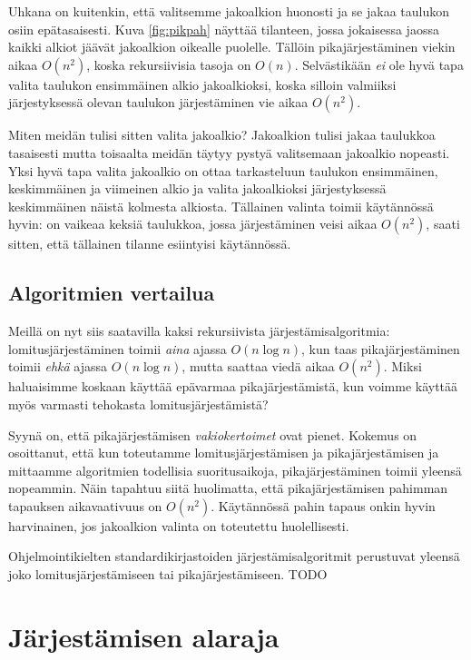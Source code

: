 Uhkana on kuitenkin, että valitsemme jakoalkion huonosti ja se jakaa
taulukon osiin epätasaisesti.
Kuva \ref{fig:pikpah} näyttää tilanteen, jossa jokaisessa jaossa
kaikki alkiot jäävät jakoalkion oikealle puolelle.
Tällöin pikajärjestäminen viekin aikaa $O(n^2)$, koska rekursiivisia
tasoja on $O(n)$.
Selvästikään \emph{ei} ole hyvä tapa valita taulukon ensimmäinen
alkio jakoalkioksi, koska silloin valmiiksi järjestyksessä olevan
taulukon järjestäminen vie aikaa $O(n^2)$.

Miten meidän tulisi sitten valita jakoalkio?
Jakoalkion tulisi jakaa taulukkoa tasaisesti mutta toisaalta
meidän täytyy pystyä valitsemaan jakoalkio nopeasti.
Yksi hyvä tapa valita jakoalkio on ottaa tarkasteluun
taulukon ensimmäinen, keskimmäinen ja viimeinen alkio ja valita
jakoalkioksi järjestyksessä keskimmäinen näistä kolmesta alkiosta.
Tällainen valinta toimii käytännössä hyvin:
on vaikeaa keksiä taulukkoa, jossa järjestäminen veisi aikaa $O(n^2)$,
saati sitten, että tällainen tilanne esiintyisi käytännössä.

\subsection{Algoritmien vertailua}

Meillä on nyt siis saatavilla kaksi rekursiivista järjestämisalgoritmia:
lomitusjärjestäminen toimii \emph{aina} ajassa $O(n \log n)$,
kun taas pikajärjestäminen toimii \emph{ehkä} ajassa $O(n \log n)$,
mutta saattaa viedä aikaa $O(n^2)$.
Miksi haluaisimme koskaan käyttää epävarmaa pikajärjestämistä,
kun voimme käyttää myös varmasti tehokasta lomitusjärjestämistä?

Syynä on, että pikajärjestämisen \emph{vakiokertoimet} ovat pienet.
Kokemus on osoittanut, että kun toteutamme lomitusjärjestämisen ja
pikajärjestämisen ja mittaamme algoritmien todellisia suoritusaikoja,
pikajärjestäminen toimii yleensä nopeammin.
Näin tapahtuu siitä huolimatta, että pikajärjestämisen pahimman
tapauksen aikavaativuus on $O(n^2)$.
Käytännössä pahin tapaus onkin hyvin harvinainen,
jos jakoalkion valinta on toteutettu huolellisesti.

Ohjelmointikielten standardikirjastoiden järjestämisalgoritmit
perustuvat yleensä joko lomitusjärjestämiseen tai pikajärjestämiseen.
TODO

\section{Järjestämisen alaraja}

